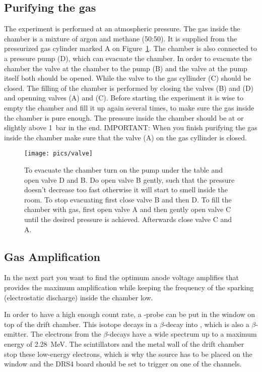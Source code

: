 \documentclass[12pt]{article}
\begin{document}
\subsection{Purifying the gas}
The experiment is performed at an atmospheric pressure. The gas inside the chamber is a mixture of argon and methane (50:50). It is supplied from the pressurized gas cylinder marked A on Figure~\ref{fig:gas}. The chamber is also connected to a pressure pump (D), which can evacuate the chamber. In order to evacuate the chamber the valve at the chamber to the pump (B) and the valve at the pump itself both should be opened. While the valve to the gas cyllinder (C) should be closed. The filling of the chamber is performed by closing the valves (B) and (D) and openning valves (A) and (C). Before starting  the experiment it is wise to empty the chamber and fill it up again several times, to make sure the gas inside the chamber is pure enough. The pressure inside the chamber should be at or slightly above  \SI{1}{\bar} in the end. IMPORTANT: When you finish purifying the gas inside the chamber make sure that the valve (A) on the gas cyllinder is closed.

\begin{figure}[!h]
	\texttt{[image: pics/valve]}
	\centering
	\caption{To evacuate the chamber turn on the pump under the table and open valve D and B. Do open valve B gently, such that the pressure doesn't decrease too fast otherwise it will start to smell inside the room.  To stop evacuating first close valve B and then D. To fill the chamber with gas, first open valve A and then gently open valve C until the desired pressure is achieved. Afterwards close valve C and A.}
	\label{fig:gas}
\end{figure}

\subsection{Gas Amplification}
In the next part you want to find the optimum anode voltage amplifies that provides the maximum amplification while keeping the frequency of the sparking (electrostatic discharge) inside the chamber low. 

In order to have a high enough count rate, a  -probe can be put in the window on top of the drift chamber. This isotope decays in a $\beta$-decay into , which is also a $\beta$-emitter. The electrons from the $\beta$-decays have a wide spectrum up to a maximum energy of \SI{2.28}{\mega\electronvolt}. The scintillators and the metal wall of the drift chamber stop these low-energy electrons, which is why the source has to be placed on the window and the DRS4 board should be set to trigger on one of the channels.
\end{document}
